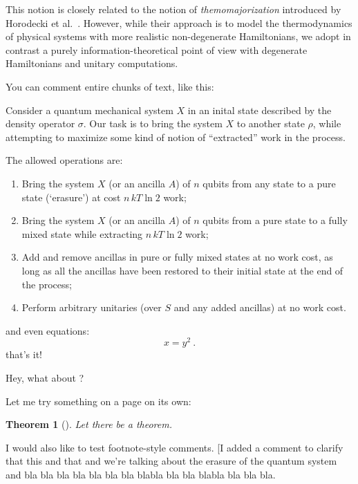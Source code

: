\documentclass[10pt,a4paper,aps,reprint,notitlepage,nofootinbib]{revtex4-1}
\newtheorem{theorem}{Theorem}
\begin{document}
This notion is closely related to the notion of {\em themomajorization}
introduced by Horodecki et al.~\cite{Horodecki2013_ThermoMaj}. However, while
their approach is to model the thermodynamics of physical systems with more
realistic non-degenerate Hamiltonians, we adopt in contrast a purely
information-theoretical point of view with degenerate Hamiltonians and unitary
computations.

\phf* You can comment entire chunks of text, like this:

Consider a quantum mechanical system $X$ in an inital state described by the
density operator $\sigma$.  
 Our task is to bring the system $X$ to another state $\rho$,
while attempting to maximize some kind of notion of ``extracted'' work in the
process.

The allowed operations are:
\begin{enumerate}[label=(\alph*)]
\item Bring the system $X$ (or an ancilla $A$) of $n$ qubits from any state to a pure state (`erasure') at
  cost $n\,kT\ln 2$ work;
\item Bring the system $X$ (or an ancilla $A$) of $n$ qubits from a pure state to a fully mixed state while
  extracting $n\,kT\ln 2$ work;
\item Add and remove ancillas in pure or fully mixed states at no work cost, as long as all the ancillas have
  been restored to their initial state at the end of the process;
\item Perform arbitrary unitaries (over $S$ and any added ancillas) at no work cost.
\end{enumerate}

and even equations:
\begin{equation}
  x = y^2\ .
\end{equation}
that's it! \endphf

Hey, what about ?




\clearpage
Let me try something on a page on its own:
\begin{theorem}[]
  Let there be a theorem.
\end{theorem}

I would also like to test footnote-style comments. \ccfive[I added a comment to
clarify that this and that and we're talking about the erasure of the quantum
system and bla bla bla bla bla bla bla blabla bla bla blabla bla bla bla.
\end{document}
